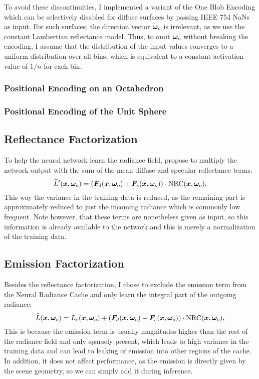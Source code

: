To avoid these discontinuities, I implemented a variant of the One Blob Encoding which can be selectively disabled for diffuse surfaces by passing IEEE 754 NaNs as input.
For such surfaces, the direction vector $\bm{\omega}_o$ is irrelevant, as we use the constant Lambertian reflectance model.
Thus, to omit $\bm{\omega}_o$ without breaking the encoding, I assume that the distribution of the input values converges to a uniform distribution over all bins, which is equivalent to a constant activation value of $1 / n$ for each bin.

\subsubsection{Positional Encoding on an Octahedron}

\subsubsection{Positional Encoding of the Unit Sphere}

\subsection{Reflectance Factorization}
To help the neural network learn the radiance field, \textcite{muller2021} propose to multiply the network output with the sum of the mean diffuse and specular reflectance terms:
\begin{equation}
    \widehat{L}'(\vec{x}, \wo) = \left( \vec{F}_d(\vec{x}, \wo) + \vec{F}_s(\vec{x}, \wo) \right) \cdot \mathrm{NRC}(\vec{x}, \wo),
\end{equation}
This way the variance in the training data is reduced, as the remaining part is approximately reduced to just the incoming radiance which is commonly low frequent.
Note however, that these terms are nonetheless given as input, so this information is already available to the network and this is merely a normalization of the training data.

\subsection{Emission Factorization}
Besides the reflectance factorization, I chose to exclude the emission term from the Neural Radiance Cache and only learn the integral part of the outgoing radiance:
\begin{equation}
    \widehat{L}(\vec{x}, \wo) = L_e(\vec{x}, \wo) + \left( \vec{F}_d(\vec{x}, \wo) + \vec{F}_s(\vec{x}, \wo) \right) \cdot \mathrm{NRC}(\vec{x}, \wo),
\end{equation}
This is because the emission term is usually magnitudes higher than the rest of the radiance field and only sparsely present, which leads to high variance in the training data and can lead to leaking of emission into other regions of the cache.
In addition, it does not affect performance, as the emission is directly given by the scene geometry, so we can simply add it during inference.

